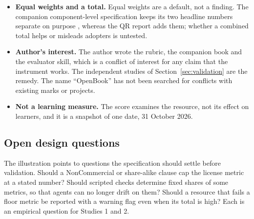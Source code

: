 \begin{itemize}[leftmargin=*,itemsep=3pt]
  \item \textbf{Equal weights and a total.} Equal weights are a default, not a finding. The companion component-level specification keeps its two headline numbers separate on purpose \cite{oerevaluator}, whereas the QR report adds them; whether a combined total helps or misleads adopters is untested.
  \item \textbf{Author's interest.} The author wrote the rubric, the companion book and the evaluator skill, which is a conflict of interest for any claim that the instrument works. The independent studies of Section~\ref{sec:validation} are the remedy. The name ``OpenBook'' has not been searched for conflicts with existing marks or projects.
  \item \textbf{Not a learning measure.} The score examines the resource, not its effect on learners, and it is a snapshot of one date, 31 October 2026.
\end{itemize}

\subsection{Open design questions}
The illustration points to questions the specification should settle before validation. Should a NonCommercial or share-alike clause cap the license metric at a stated number? Should scripted checks determine fixed shares of some metrics, so that agents can no longer drift on them? Should a resource that fails a floor metric be reported with a warning flag even when its total is high? Each is an empirical question for Studies 1 and 2.
